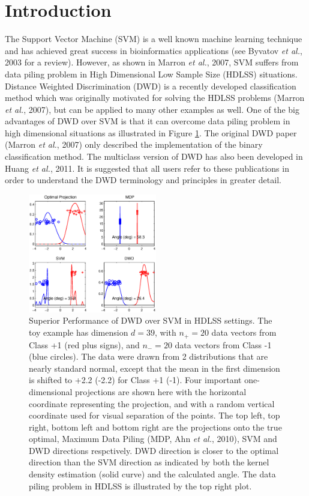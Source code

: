 \documentclass{bioinfo}
\begin{document}
\section{Introduction}

The Support Vector Machine (SVM) is a well known machine learning technique and
has achieved great success in bioinformatics applications (see Byvatov {\em et
al.}, 2003 for a review). However, as shown in Marron {\em et al.}, 2007, SVM
suffers from data piling problem in High Dimensional Low Sample Size (HDLSS) situations.
Distance Weighted Discrimination (DWD) is a recently developed classification
method which was originally motivated for solving the HDLSS problems (Marron
{\em et al.}, 2007), but can be applied to many other examples as well. One of
the big advantages of DWD over SVM is that it can overcome data piling problem
in high dimensional situations as illustrated in Figure \ref{dwdsvm}. The
original DWD paper (Marron {\em et al.}, 2007) only described the
implementation of the binary classification method. The multiclass version of
DWD has also been developed in Huang {\em et al.}, 2011. It is suggested that
all users refer to these publications in order to understand the DWD terminology
and principles in greater detail.

\begin{figure}[ht]
\begin{center}
\includegraphics[keepaspectratio=true, width=0.5\textwidth]{mdp.ps}
\caption{Superior Performance of DWD over SVM in HDLSS settings. The toy example
has dimension $d=39$, with $n_+=20$ data vectors from Class +1 (red plus
signs), and $n_-=20$ data vectors from Class -1 (blue circles). The
data were drawn from 2 distributions that are nearly standard normal, except
that the mean in the first dimension is shifted to +2.2 (-2.2) for Class +1
(-1). Four important one-dimensional projections are shown here with the
horizontal coordinate representing the projection, and with a random vertical
coordinate used for visual separation of the points. The top left, top right,
bottom left and bottom right are the projections onto the true optimal, Maximum
Data Piling (MDP, Ahn {\em et al.}, 2010), SVM and DWD directions
respctively. DWD direction is closer to the optimal direction than the SVM
direction as indicated by both the kernel density estimation (solid curve) and
the calculated angle. The data piling problem in HDLSS is illustrated by
the top right plot.}
\end{center}
\label{dwdsvm}
\end{figure}
\end{document}
